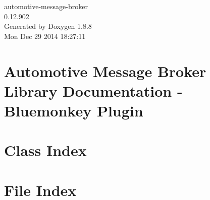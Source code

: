 \documentclass[twoside]{book}
\newcommand{\+}{\discretionary{\mbox{\scriptsize$\hookleftarrow$}}{}{}}
\newcommand{\clearemptydoublepage}{%
  \newpage{\pagestyle{empty}\cleardoublepage}%
}
\begin{document}
\hypersetup{pageanchor=false,
             bookmarks=true,
             bookmarksnumbered=true,
             pdfencoding=unicode
            }
\begin{titlepage}
\vspace*{7cm}
\begin{center}%
{\Large automotive-\/message-\/broker \\[1ex]\large 0.\+12.\+902 }\\
\vspace*{1cm}
{\large Generated by Doxygen 1.8.8}\\
\vspace*{0.5cm}
{\small Mon Dec 29 2014 18:27:11}\\
\end{center}
\end{titlepage}
\clearemptydoublepage
\tableofcontents
\clearemptydoublepage
{}
\hypersetup{pageanchor=true}

\chapter{Automotive Message Broker Library Documentation -\/ Bluemonkey Plugin}
\label{index}\hypertarget{index}{}
\chapter{Class Index}

\chapter{File Index}

\end{document}
